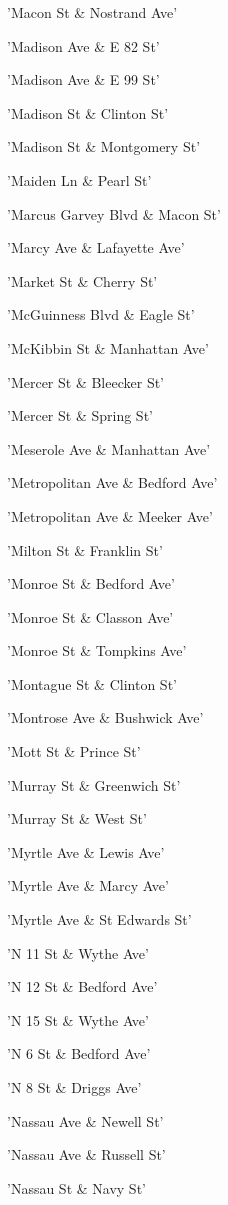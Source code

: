 \documentclass[11pt]{article}
\begin{document}
\begin{enumerate*}
\item 'Macon St \& Nostrand Ave'
\item 'Madison Ave \& E 82 St'
\item 'Madison Ave \& E 99 St'
\item 'Madison St \& Clinton St'
\item 'Madison St \& Montgomery St'
\item 'Maiden Ln \& Pearl St'
\item 'Marcus Garvey Blvd \& Macon St'
\item 'Marcy Ave \& Lafayette Ave'
\item 'Market St \& Cherry St'
\item 'McGuinness Blvd \& Eagle St'
\item 'McKibbin St \& Manhattan Ave'
\item 'Mercer St \& Bleecker St'
\item 'Mercer St \& Spring St'
\item 'Meserole Ave \& Manhattan Ave'
\item 'Metropolitan Ave \& Bedford Ave'
\item 'Metropolitan Ave \& Meeker Ave'
\item 'Milton St \& Franklin St'
\item 'Monroe St \& Bedford Ave'
\item 'Monroe St \& Classon Ave'
\item 'Monroe St \& Tompkins Ave'
\item 'Montague St \& Clinton St'
\item 'Montrose Ave \& Bushwick Ave'
\item 'Mott St \& Prince St'
\item 'Murray St \& Greenwich St'
\item 'Murray St \& West St'
\item 'Myrtle Ave \& Lewis Ave'
\item 'Myrtle Ave \& Marcy Ave'
\item 'Myrtle Ave \& St Edwards St'
\item 'N 11 St \& Wythe Ave'
\item 'N 12 St \& Bedford Ave'
\item 'N 15 St \& Wythe Ave'
\item 'N 6 St \& Bedford Ave'
\item 'N 8 St \& Driggs Ave'
\item 'Nassau Ave \& Newell St'
\item 'Nassau Ave \& Russell St'
\item 'Nassau St \& Navy St'

\end{enumerate*}
\end{document}
